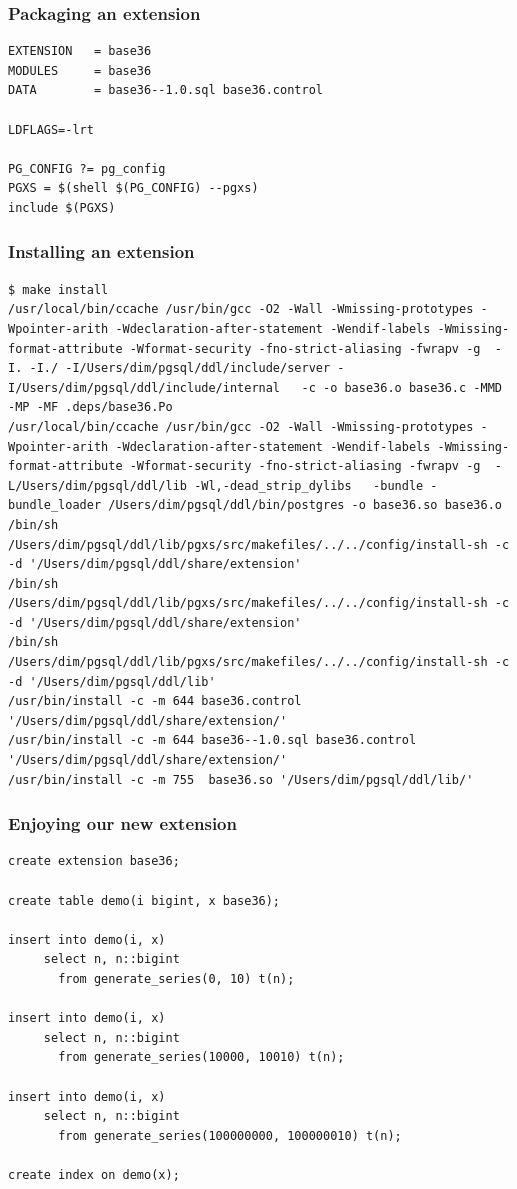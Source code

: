 \documentclass{beamer}
\begin{document}
\begin{frame}[fragile]
  \frametitle{Packaging an extension}

  \vfill

\begin{verbatim}
EXTENSION   = base36
MODULES     = base36
DATA        = base36--1.0.sql base36.control

LDFLAGS=-lrt

PG_CONFIG ?= pg_config
PGXS = $(shell $(PG_CONFIG) --pgxs)
include $(PGXS)
\end{verbatim}
\end{frame}

\begin{frame}[fragile]
  \frametitle{Installing an extension}

\begin{verbatim}
$ make install
/usr/local/bin/ccache /usr/bin/gcc -O2 -Wall -Wmissing-prototypes -Wpointer-arith -Wdeclaration-after-statement -Wendif-labels -Wmissing-format-attribute -Wformat-security -fno-strict-aliasing -fwrapv -g  -I. -I./ -I/Users/dim/pgsql/ddl/include/server -I/Users/dim/pgsql/ddl/include/internal   -c -o base36.o base36.c -MMD -MP -MF .deps/base36.Po
/usr/local/bin/ccache /usr/bin/gcc -O2 -Wall -Wmissing-prototypes -Wpointer-arith -Wdeclaration-after-statement -Wendif-labels -Wmissing-format-attribute -Wformat-security -fno-strict-aliasing -fwrapv -g  -L/Users/dim/pgsql/ddl/lib -Wl,-dead_strip_dylibs   -bundle -bundle_loader /Users/dim/pgsql/ddl/bin/postgres -o base36.so base36.o
/bin/sh /Users/dim/pgsql/ddl/lib/pgxs/src/makefiles/../../config/install-sh -c -d '/Users/dim/pgsql/ddl/share/extension'
/bin/sh /Users/dim/pgsql/ddl/lib/pgxs/src/makefiles/../../config/install-sh -c -d '/Users/dim/pgsql/ddl/share/extension'
/bin/sh /Users/dim/pgsql/ddl/lib/pgxs/src/makefiles/../../config/install-sh -c -d '/Users/dim/pgsql/ddl/lib'
/usr/bin/install -c -m 644 base36.control '/Users/dim/pgsql/ddl/share/extension/'
/usr/bin/install -c -m 644 base36--1.0.sql base36.control '/Users/dim/pgsql/ddl/share/extension/'
/usr/bin/install -c -m 755  base36.so '/Users/dim/pgsql/ddl/lib/'
\end{verbatim}
\end{frame}


\begin{frame}[fragile]
  \frametitle{Enjoying our new extension}

\begin{verbatim}
create extension base36;
    
create table demo(i bigint, x base36);

insert into demo(i, x)
     select n, n::bigint
       from generate_series(0, 10) t(n);
    
insert into demo(i, x)
     select n, n::bigint
       from generate_series(10000, 10010) t(n);
    
insert into demo(i, x)
     select n, n::bigint
       from generate_series(100000000, 100000010) t(n);

create index on demo(x);
\end{verbatim}
\end{frame}
\end{document}
